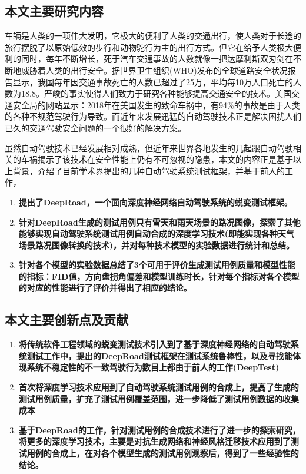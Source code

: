 \subsection{本文主要研究内容}

车辆是人类的一项伟大发明，它极大的便利了人类的交通出行，使人类对于长途的旅行摆脱了以原始低效的步行和动物驼行为主的出行方式。但它在给予人类极大便利的同时，每年不断增长，死于汽车交通事故的人数就像一把达摩利斯双刃剑在不断地威胁着人类的出行安全。据世界卫生组织(WHO)发布的全球道路安全状况报告\cite{who}显示，我国每年因交通事故死亡的人数已超过了25万，平均每10万人口死亡的人数为18.8。严峻的事实使得人们致力于研究各种能够提高交通安全的技术。美国交通安全局的网站\cite{usdt}显示：2018年在美国发生的致命车祸中，有94\%的事故是由于人类的各种不规范驾驶行为导致。而近年来发展迅猛的自动驾驶技术正是解决困扰人们已久的交通驾驶安全问题的一个很好的解决方案。

虽然自动驾驶技术已经发展相对成熟，但近年来世界各地发生的几起跟自动驾驶相关的车祸揭示了该技术在安全性能上仍有不可忽视的隐患，本文的内容正是基于以上背景，介绍了目前学术界提出的几种自动驾驶系统测试框架，并基于前人的工作，
\begin{enumerate}
    \item \textbf{提出了DeepRoad，一个面向深度神经网络自动驾驶系统的蜕变测试框架。}
    \item \textbf{针对DeepRoad生成的测试用例只有雪天和雨天场景的路况图像，探索了其他能够实现自动驾驶系统测试用例自动合成的深度学习技术(即能实现各种天气场景路况图像转换的技术)，并对每种技术模型的实验数据进行统计和总结。}
    \item \textbf{针对各个模型的实验数据总结了3个可用于评价生成测试用例质量和模型性能的指标：FID值，方向盘拐角偏差和模型训练时长，针对每个指标对各个模型的对应的性能进行了评价并得出了相应的结论。}
\end{enumerate}

\subsection{本文主要创新点及贡献}

\begin{enumerate}
    \item \textbf{将传统软件工程领域的蜕变测试技术引入到了基于深度神经网络的自动驾驶系统测试工作中，提出的DeepRoad测试框架在测试系统鲁棒性，以及寻找能体现系统不稳定性的不一致驾驶行为数目上都由于前人的工作(DeepTest)}
    \item \textbf{首次将深度学习技术应用到了自动驾驶系统测试用例的合成上，提高了生成的测试用例质量，扩充了测试用例覆盖范围，进一步降低了测试用例数据的收集成本}
    \item \textbf{基于DeepRoad的工作，针对测试用例的合成技术进行了进一步的探索研究，将更多的深度学习技术，主要是对抗生成网络和神经风格迁移技术应用到了测试用例的合成上，在对各个模型生成的测试用例观察后，得到了一些经验性的结论。}
\end{enumerate}
